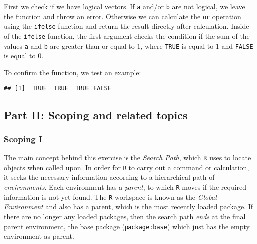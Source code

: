 \documentclass[11,]{article}
\newenvironment{Shaded}{\begin{snugshade}}{\end{snugshade}}
\newcommand{\KeywordTok}[1]{\textcolor[rgb]{0.13,0.29,0.53}{\textbf{{#1}}}}
\newcommand{\StringTok}[1]{\textcolor[rgb]{0.31,0.60,0.02}{{#1}}}
\newcommand{\OtherTok}[1]{\textcolor[rgb]{0.56,0.35,0.01}{{#1}}}
\newcommand{\NormalTok}[1]{{#1}}
\begin{document}
First we check if we have logical vectors. If \texttt{a} and/or
\texttt{b} are not logical, we leave the function and throw an error.
Otherwise we can calculate the \texttt{or} operation using the
\texttt{ifelse} function and return the result directly after
calculation. Inside of the \texttt{ifelse} function, the first argument
checks the condition if the sum of the values \texttt{a} and \texttt{b}
are greater than or equal to \(1\), where \texttt{TRUE} is equal to
\(1\) and \texttt{FALSE} is equal to \(0\).

To confirm the function, we test an example:

\begin{Shaded}
\end{Shaded}

\begin{verbatim}
## [1]  TRUE  TRUE  TRUE FALSE
\end{verbatim}

\subsection{Part II: Scoping and related
topics}\label{part-ii-scoping-and-related-topics}

\subsubsection{Scoping I}\label{scoping-i}

The main concept behind this exercise is the \emph{Search Path}, which
\texttt{R} uses to locate objects when called upon. In order for
\texttt{R} to carry out a command or calculation, it seeks the necessary
information according to a hierarchical path of \emph{environments}.
Each environment has a \emph{parent}, to which \texttt{R} moves if the
required information is not yet found. The \texttt{R} workspace is known
as the \emph{Global Environment} and also has a parent, which is the
most recently loaded package. If there are no longer any loaded
packages, then the search path \emph{ends} at the final parent
environment, the base package (\texttt{package:base}) which just has the
empty environment as parent.
\end{document}
